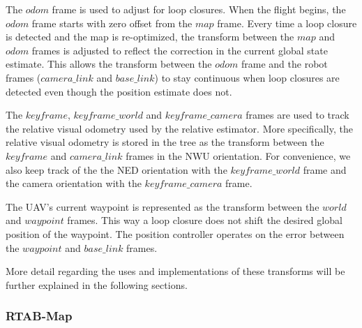 \documentclass[letterpaper, 10 pt, conference]{ieeeconf}  %
\begin{document}
The $\mathit{odom}$ frame is used to adjust for loop closures. When the flight begins, the $\mathit{odom}$ frame starts with zero offset from the $\mathit{map}$ frame. Every time a loop closure is detected and the map is re-optimized, the transform between the $\mathit{map}$ and $\mathit{odom}$ frames is adjusted to reflect the correction in the current global state estimate. This allows the transform between the $\mathit{odom}$ frame and the robot frames ($\mathit{camera\_link}$ and $\mathit{base\_link}$) to stay continuous when loop closures are detected even though the position estimate does not.

The $\mathit{keyframe}$, $\mathit{keyframe\_world}$ and $\mathit{keyframe\_camera}$ frames are used to track the relative visual odometry used by the relative estimator. More specifically, the relative visual odometry is stored in the tree as the transform between the $\mathit{keyframe}$ and $\mathit{camera\_link}$ frames in the NWU orientation. For convenience, we also keep track of the the NED orientation with the $\mathit{keyframe\_world}$ frame and the camera orientation with the $\mathit{keyframe\_camera}$ frame.

The UAV's current waypoint is represented as the transform between the $\mathit{world}$ and $\mathit{waypoint}$ frames. This way a loop closure does not shift the desired global position of the waypoint. The position controller operates on the error between the $\mathit{waypoint}$ and $\mathit{base\_link}$ frames.

More detail regarding the uses and implementations of these transforms will be further explained in the following sections.


\subsubsection{RTAB-Map}
\end{document}
